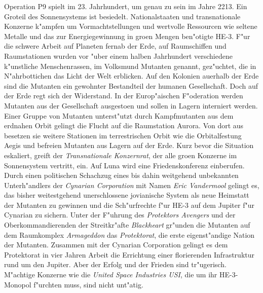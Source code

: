 \newchapter{\@introchaptername}

Operation P9 spielt im 23. Jahrhundert, um genau zu sein im Jahre 2213. Ein Gro\3teil des Sonnensystems ist besiedelt. Nationalstaaten und transnationale Konzerne k"ampfen um Vormachtstellungen und wertvolle Ressourcen wie seltene Metalle und das zur Energiegewinnung in gro\3en Mengen ben"otigte HE-3. F"ur die schwere Arbeit auf Planeten fernab der Erde, auf Raumschiffen und Raumstationen wurden vor "uber einem halben Jahrhundert verschiedene k"unstliche Menschenrassen, im Volksmund Mutanten genannt, gez"uchtet, die in N"ahrbottichen das Licht der Welt erblicken. Auf den Kolonien au\3erhalb der Erde sind die Mutanten ein gewohnter Bestandteil der humanen Gesellschaft. Doch auf der Erde regt sich der Widerstand. In der Europ"aischen F"oderation werden Mutanten aus der Gesellschaft ausgesto\3en und sollen in Lagern interniert werden. Einer Gruppe von Mutanten unterst"utzt durch Kampfmutanten aus dem erdnahen Orbit gelingt die Flucht auf die Raumstation Aurora. Von dort aus besetzen sie weitere Stationen im terrestrischen Orbit wie die Orbitalfestung Aegis und befreien Mutanten aus Lagern auf der Erde. Kurz bevor die Situation eskaliert, greift der \emph{Transnationale Konzernrat}, der alle gro\3en Konzerne im Sonnensystem vertritt, ein. Auf Luna wird eine Friedenskonferenz einberufen. Durch einen politischen Schachzug eines bis dahin weitgehend unbekannten Unterh"andlers der \emph{Cynarian Corporation} mit Namen \emph{Eric Vandermool} gelingt es, das bisher weitestgehend unerschlossene jovianische System als neue Heimstatt der Mutanten zu gewinnen und die Sch"urfrechte f"ur HE-3 auf dem Jupiter f"ur Cynarian zu sichern. Unter der F"uhrung des \emph{Protektors Avengers} und der Oberkommandierenden der Streitkr"afte \emph{Blackheart} gr"unden die Mutanten auf dem Raumkomplex \emph{Armageddon} das \emph{Protektorat}, die erste eigenst"andige Nation der Mutanten. Zusammen mit der Cynarian Corporation gelingt es dem Protektorat in vier Jahren Arbeit die Errichtung einer florierenden Infrastruktur rund um den Jupiter. Aber der Erfolg und der Frieden sind tr"ugerisch. M"achtige Konzerne wie die \emph{United Space Industries USI}, die um ihr HE-3-Monopol f"urchten muss, sind nicht unt"atig.